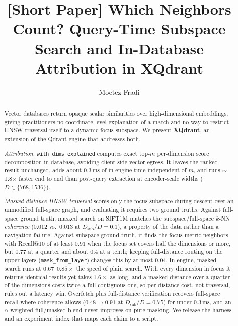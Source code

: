 \documentclass[sigconf,review,balance=false]{acmart}
\begin{document}
\title{[Short Paper] Which Neighbors Count? Query-Time Subspace Search
  and In-Database Attribution in XQdrant}

\author{Moetez Fradi}

\renewcommand{\shortauthors}{Fradi}

\begin{abstract}
Vector databases return opaque scalar similarities over high-dimensional
embeddings, giving practitioners no coordinate-level explanation of a match and
no way to restrict HNSW traversal itself to a dynamic focus subspace. We present
\textbf{XQdrant}, an extension of the Qdrant engine that addresses both.

\emph{Attribution}: \texttt{with\_dims\_explained} computes exact top-$m$
per-dimension score decomposition in-database, avoiding client-side vector
egress. It leaves the ranked result unchanged, adds about 0.3\,ms of in-engine
time independent of $m$, and runs $\sim$1.8$\times$ faster end to end than
post-query extraction at encoder-scale widths ($D\in\{768,1536\}$).

\emph{Masked-distance HNSW traversal} scores only the focus subspace during
descent over an unmodified full-space graph, and evaluating it requires two
ground truths. Against full-space ground truth, masked search on SIFT1M matches
the subspace/full-space $k$-NN \emph{coherence} ($0.012$ vs.\ $0.013$
at $D_{\mathrm{sub}}/D=0.1$), a property of the data rather than a navigation
failure. Against subspace ground truth, it finds the focus-metric neighbors
with Recall@10 of at least $0.91$ when the focus set covers half the dimensions
or more, but $0.77$ at a quarter and about $0.4$ at a tenth; keeping
full-distance routing on the upper layers (\texttt{mask\_from\_layer}) changes
this by at most $0.04$. In-engine, masked search runs at $0.67$--$0.85\times$
the speed of plain search. With every dimension in focus it returns identical
results yet takes $1.6\times$ as long, and a masked distance over a quarter of
the dimensions costs twice a full contiguous one, so per-distance cost, not
traversal, rules out a latency win. Overfetch plus
full-distance verification recovers full-space recall where coherence allows
($0.48\rightarrow 0.91$ at $D_{\mathrm{sub}}/D=0.75$) for under 0.3\,ms, and an
$\alpha$-weighted full/masked blend never improves on pure masking. We release
the harness and an experiment index that maps each claim to a script.
\end{abstract}
\end{document}
